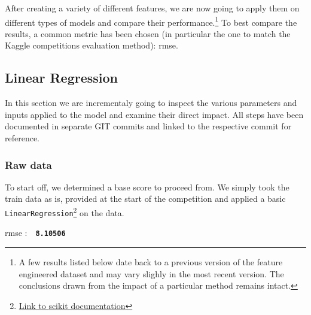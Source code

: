 \newcommand{\rmse}[1]{
	\vspace*{-2mm}
	\begin{center}
		\begin{tcolorbox}[colback=white, colframe=iwiPurple, halign=flush center, width=0.8\linewidth, boxrule=1pt, arc=4mm]
				\Acrshort{rmse} :\ \ \textbf{\texttt{#1}}
		\end{tcolorbox}
	\end{center}
}


After creating a variety of different features, we are now going to apply them on different types of models and compare their performance.\footnote{A few results listed below date back to a previous version of the feature engineered dataset and may vary slighly in the most recent version. The conclusions drawn from the impact of a particular method remains intact.} To best compare the results, a common metric has been chosen (in particular the one to match the Kaggle competitions evaluation method): \acrfull{rmse}.

\subsection{Linear Regression}

In this section we are incrementaly going to inspect the various parameters and inputs applied to the model and examine their direct impact. All steps have been documented in separate GIT commits and linked to the respective commit for reference.

\subsubsection{Raw data}

To start off, we determined a base score to proceed from. We simply took the train data as is, provided at the start of the competition and applied a basic \texttt{LinearRegression}\footnote{\href{https://scikit-learn.org/stable/modules/generated/sklearn.linear_model.LinearRegression.html\#sklearn.linear_model.LinearRegression}{Link to \gls{scikit} documentation}} on the data.
\rmse{8.10506}


